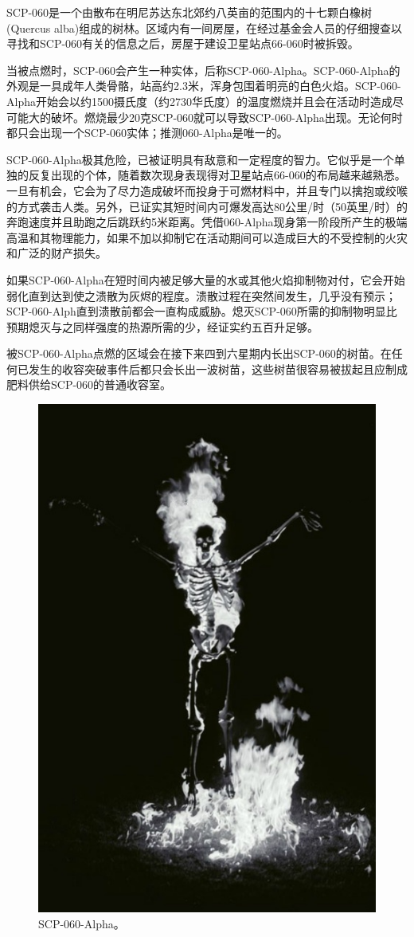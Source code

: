 SCP-060是一个由散布在明尼苏达东北郊约八英亩的范围内的十七颗白橡树(Quercus alba)组成的树林。区域内有一间房屋，在经过基金会人员的仔细搜查以寻找和SCP-060有关的信息之后，房屋于建设卫星站点66-060时被拆毁。

当被点燃时，SCP-060会产生一种实体，后称SCP-060-Alpha。SCP-060-Alpha的外观是一具成年人类骨骼，站高约2.3米，浑身包围着明亮的白色火焰。SCP-060-Alpha开始会以约1500摄氏度（约2730华氏度）的温度燃烧并且会在活动时造成尽可能大的破坏。燃烧最少20克SCP-060就可以导致SCP-060-Alpha出现。无论何时都只会出现一个SCP-060实体；推测060-Alpha是唯一的。

SCP-060-Alpha极其危险，已被证明具有敌意和一定程度的智力。它似乎是一个单独的反复出现的个体，随着数次现身表现得对卫星站点66-060的布局越来越熟悉。一旦有机会，它会为了尽力造成破坏而投身于可燃材料中，并且专门以擒抱或绞喉的方式袭击人类。另外，已证实其短时间内可爆发高达80公里\slash 时（50英里\slash 时）的奔跑速度并且助跑之后跳跃约5米距离。凭借060-Alpha现身第一阶段所产生的极端高温和其物理能力，如果不加以抑制它在活动期间可以造成巨大的不受控制的火灾和广泛的财产损失。

如果SCP-060-Alpha在短时间内被足够大量的水或其他火焰抑制物对付，它会开始弱化直到达到使之溃散为灰烬的程度。溃散过程在突然间发生，几乎没有预示；SCP-060-Alph直到溃散前都会一直构成威胁。熄灭SCP-060所需的抑制物明显比预期熄灭与之同样强度的热源所需的少，经证实约五百升足够。

被SCP-060-Alpha点燃的区域会在接下来四到六星期内长出SCP-060的树苗。在任何已发生的收容突破事件后都只会长出一波树苗，这些树苗很容易被拔起且应制成肥料供给SCP-060的普通收容室。

\begin{figure}[H]
    \centering
    \includegraphics[width=0.5\linewidth]{images/SCP-060-2.jpg}
    \caption*{SCP-060-Alpha。}
\end{figure}

